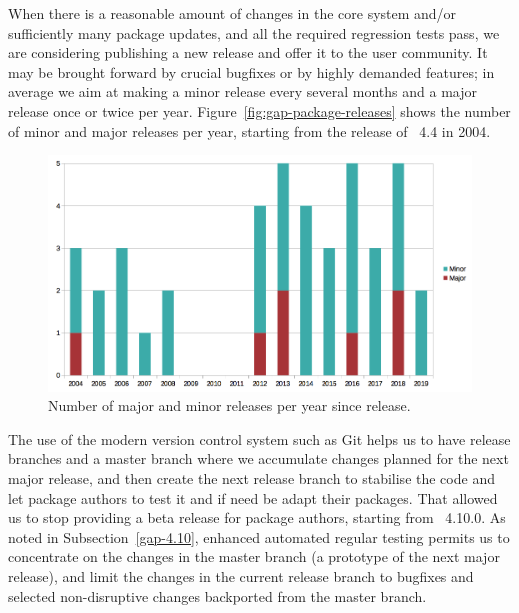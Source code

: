 When there is a reasonable amount of changes in the core \GAP system
and/or sufficiently many package updates, and all the required
regression tests pass, we are considering publishing a new \GAP release
and offer it to the user community. It may be 
brought forward by crucial bugfixes or by highly demanded features;
in average we aim at making a minor release every several months 
and a major release once or twice per year. 
Figure~\ref{fig:gap-package-releases} shows the number of minor
and major \GAP releases per year, starting from the release of
\GAP~4.4 in 2004.

\begin{figure}[!ht]
    \centering
    \includegraphics[width=\textwidth]{images/gap-releases}
    \caption{Number of major and minor \GAP releases per year since  release.}
    \label{fig:gap-releases}
\end{figure}

The use of the modern version control system such as {\sf Git}
helps us to have release branches and a master branch
where we accumulate changes planned for the next major release, and then
create the next release branch to stabilise the code and let package
authors to test it and if need be adapt their packages. That allowed
us to stop providing a beta release for package authors, starting from
\GAP~4.10.0. As noted in Subsection~\ref{gap-4.10},
enhanced automated regular testing permits us to concentrate on 
the changes in the master branch (a prototype of the next major release), and limit 
the changes in the current release branch to bugfixes and selected 
non-disruptive changes backported from the master branch.

